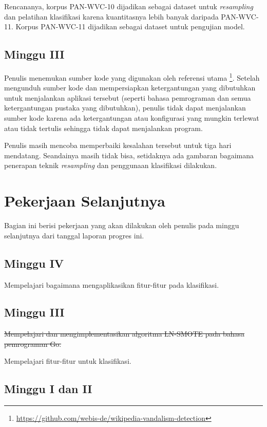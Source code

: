 \documentclass[12pt,a4paper,titlepage]{article}
\begin{document}
Rencananya, korpus PAN-WVC-10 dijadikan sebagai dataset untuk \textit{resampling} dan pelatihan klasifikasi karena kuantitasnya lebih banyak daripada PAN-WVC-11.
Korpus PAN-WVC-11 dijadikan sebagai dataset untuk pengujian model.

\subsection{Minggu III}

Penulis menemukan sumber kode yang digunakan oleh referensi utama
\footnote{
	\url{https://github.com/webis-de/wikipedia-vandalism-detection}
}.
Setelah mengunduh sumber kode dan mempersiapkan ketergantungan yang dibutuhkan untuk menjalankan aplikasi tersebut (seperti bahasa pemrograman dan semua ketergantungan pustaka yang dibutuhkan), penulis tidak dapat menjalankan sumber kode karena ada ketergantungan atau konfigurasi yang mungkin terlewat atau tidak tertulis sehingga tidak dapat menjalankan program.

Penulis masih mencoba memperbaiki kesalahan tersebut untuk tiga hari mendatang.
Seandainya masih tidak bisa, setidaknya ada gambaran bagaimana penerapan teknik \textit{resampling} dan penggunaan klasifikasi dilakukan.

\section{Pekerjaan Selanjutnya}

Bagian ini berisi pekerjaan yang akan dilakukan oleh penulis pada minggu selanjutnya dari tanggal laporan progres ini.

\subsection{Minggu IV}

Mempelajari bagaimana mengaplikasikan fitur-fitur pada klasifikasi.

\subsection{Minggu III}

\sout{
Mempelajari dan mengimplementasikan algoritma LN-SMOTE pada bahasa pemrograman Go.
}

Mempelajari fitur-fitur untuk klasifikasi.

\subsection{Minggu I dan II}
\end{document}
